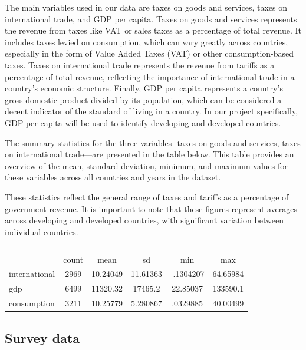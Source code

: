 \documentclass[12pt]{article}
\begin{document}
The main variables used in our data are taxes on goods and services, taxes on international trade, and GDP per capita. Taxes on goods and services represents the revenue from taxes like VAT or sales taxes as a percentage of total revenue. It includes taxes levied on consumption, which can vary greatly across countries, especially in the form of Value Added Taxes (VAT) or other consumption-based taxes. Taxes on international trade represents the revenue from tariffs as a percentage of total revenue, reflecting the importance of international trade in a country's economic structure. Finally, GDP per capita represents a country's gross domestic product divided by its population, which can be considered a decent indicator of the standard of living in a country. In our project specifically, GDP per capita will be used to identify developing and developed countries. 

The summary statistics for the three variables- taxes on goods and services, taxes on international trade—are presented in the table below. This table provides an overview of the mean, standard deviation, minimum, and maximum values for these variables across all countries and years in the dataset.



These statistics reflect the general range of taxes and tariffs as a percentage of government revenue. It is important to note that these figures represent averages across developing and developed countries, with significant variation between individual countries.


{
\def\sym#1{\ifmmode^{#1}\else\(^{#1}\)\fi}
\begin{tabular}{l*{1}{ccccc}}
            &\multicolumn{5}{c}{}                                         \\
            &\multicolumn{5}{c}{}                                            \\
            &       count&        mean&          sd&         min&         max\\
\hline
international&        2969&    10.24049&    11.61363&   -.1304207&    64.65984\\
gdp         &        6499&    11320.32&     17465.2&    22.85037&    133590.1\\
consumption &        3211&    10.25779&    5.280867&    .0329885&    40.00499\\
\hline
\end{tabular}
}


\subsection{Survey data} 
\end{document}
